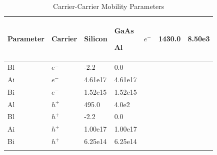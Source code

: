 



\small

\begin{longtable}[htbp]{|
>{\setlength{\hsize}{0.5\hsize}}Y|
>{\setlength{\hsize}{0.5\hsize}}Y|
>{\setlength{\hsize}{0.5\hsize}}Y|
>{\setlength{\hsize}{0.5\hsize}}Y|} 

  \caption[Carrier-Carrier Mobility Parameters]
   {Carrier-Carrier Mobility Parameters \label{carr}}
\\
\hline

\color{white} \bf Parameter &
\color{white} \bf Carrier   &
\color{white} \bf Silicon   &
\color{white} \bf GaAs      \endhead \hline 

  Al  &  $e^{-}$  & 1430.0  & 8.50e3  \\ \hline
  Bl  &  $e^{-}$  & -2.2    & 0.0     \\ \hline
  Ai  &  $e^{-}$  & 4.61e17 & 4.61e17 \\ \hline
  Bi  &  $e^{-}$  & 1.52e15 & 1.52e15 \\ \hline
  Al  &  $h^{+}$  & 495.0   & 4.0e2   \\ \hline
  Bl  &  $h^{+}$  &  -2.2   & 0.0     \\ \hline
  Ai  &  $h^{+}$  & 1.00e17 & 1.00e17 \\ \hline
  Bi  &  $h^{+}$  & 6.25e14 & 6.25e14 \\ \hline
\label{carrierCarrierMobModParams}   
\end{longtable}
